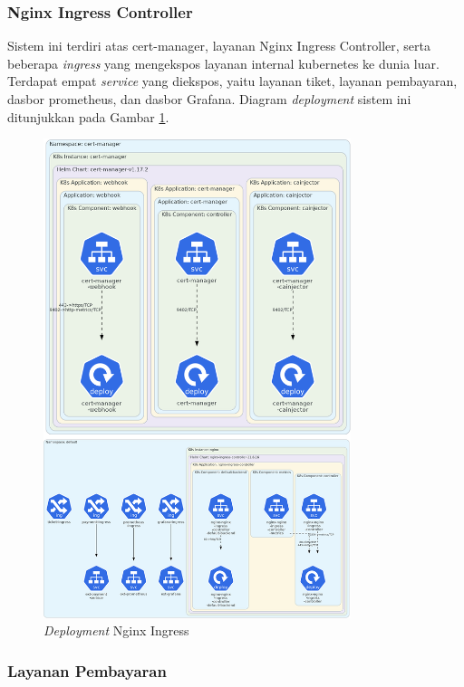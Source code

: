 \subsubsection{Nginx Ingress Controller}

Sistem ini terdiri atas cert-manager, layanan Nginx Ingress Controller, serta beberapa \textit{ingress} yang mengekspos layanan internal kubernetes ke dunia luar. Terdapat empat \textit{service} yang diekspos, yaitu layanan tiket, layanan pembayaran, dasbor prometheus, dan dasbor Grafana. Diagram \textit{deployment} sistem ini ditunjukkan pada Gambar \ref{fig:deployment-nginx}.

\begin{figure}[htbp]
    \centering
    \includegraphics[width=0.8\textwidth]{resources/chapter-4/nginx-1.png}
    \caption{\textit{Deployment} Nginx Ingress}
    \label{fig:deployment-nginx}
\end{figure}

\pagebreak

\subsubsection{Layanan Pembayaran}

